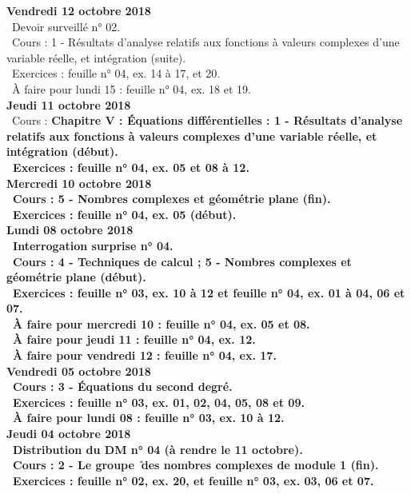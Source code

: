 \documentclass[12pt,a4paper]{article}
\begin{document}
\noindent\textbf{Vendredi 12 octobre 2018}\\
\bu\ Devoir surveillé n° 02.\\
\bu\ Cours : 1 - Résultats d'analyse relatifs aux fonctions à valeurs complexes d'une variable réelle, et intégration 
(suite).\\
\bu\ Exercices : feuille n° 04, ex. 14 à 17, et 20.\\
\bu\ À faire pour lundi 15 : feuille n° 04, ex. 18 et 19.\vspace{.4cm}\\
 
\noindent\textbf{Jeudi 11 octobre 2018}\\
\bu\ Cours : \bf Chapitre V \rm : Équations différentielles : 1 - Résultats d'analyse relatifs aux fonctions à valeurs complexes d'une variable réelle, et intégration (début).\\
\bu\ Exercices : feuille n° 04, ex. 05 et 08 à 12.\vspace{.4cm}\\
 
\noindent\textbf{\bf Mercredi 10 octobre 2018}\\
\bu\ Cours : 5 - Nombres complexes et géométrie plane (fin).\\
\bu\ Exercices : feuille n° 04, ex. 05 (début).\vspace{.4cm}\\
 
\noindent\textbf{\bf Lundi 08 octobre 2018}\\
\bu\ Interrogation surprise n° 04.\\ 
\bu\ Cours : 4 - Techniques de calcul ; 5 - Nombres complexes et géométrie plane (début).\\
\bu\ Exercices : feuille n° 03, ex. 10 à 12 et feuille n° 04, ex. 01 à 04, 06 et 07.\\
\bu\ À faire pour mercredi 10 : feuille n° 04, ex. 05 et 08.\\
\bu\ À faire pour jeudi 11 : feuille n° 04, ex. 12.\\
\bu\ À faire pour vendredi 12 : feuille n° 04, ex. 17.\vspace{.4cm}\\
 
\noindent\textbf{Vendredi 05 octobre 2018}\\
\bu\ Cours : 3 - Équations du second degré.\\
\bu\ Exercices : feuille n° 03, ex. 01, 02, 04, 05, 08 et 09.\\
\bu\ À faire pour lundi 08 : feuille n° 03, ex. 10 à 12.\vspace{.4cm}\\
% 
\noindent\textbf{Jeudi 04 octobre 2018}\\
\bu\ Distribution du DM n° 04 (à rendre le 11 octobre).\\
\bu\ Cours : 2 - Le groupe \U\ des nombres complexes de module 1 (fin).
\bu\ Exercices : feuille n° 02, ex. 20, et feuille n° 03, ex. 03, 06 et 07.\vspace{.4cm}\\
\end{document}
